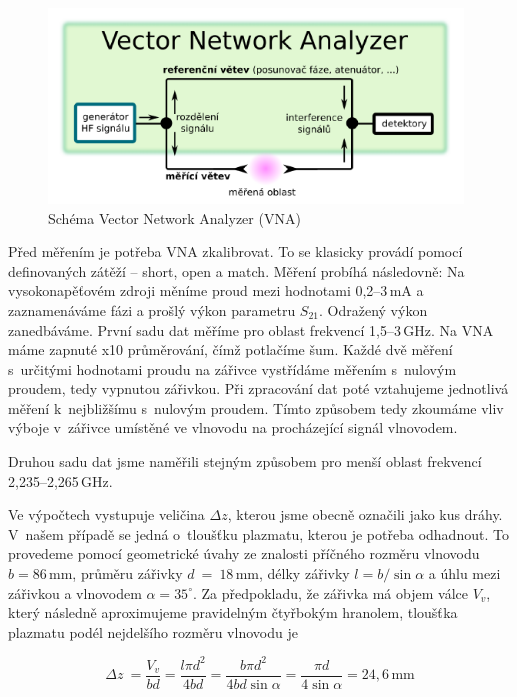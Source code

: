 \documentclass[a4paper,12pt]{article}
\begin{document}
\begin{figure}[h]
	\centering
	\includegraphics[width=110mm]{vna.png}
	\caption{Schéma Vector Network Analyzer (VNA)}
	\label{vna}
\end{figure}

Před měřením je potřeba VNA zkalibrovat. To se klasicky provádí pomocí definovaných
zátěží -- short, open a match. Měření probíhá následovně: Na vysokonapěťovém zdroji
měníme proud mezi hodnotami 0,2--3\,\si{\milli\ampere} a zaznamenáváme fázi a 
prošlý
výkon parametru $S_{21}$. Odražený výkon zanedbáváme. První sadu dat měříme pro oblast
frekvencí 1,5--3\,\si{\giga\hertz}. Na VNA máme zapnuté x10 průměrování, čímž 
potlačíme
šum. Každé dvě měření s~určitými hodnotami proudu na zářivce vystřídáme měřením
s~nulovým proudem, tedy vypnutou zářivkou. Při zpracování dat poté vztahujeme jednotlivá
měření k~nejbližšímu s~nulovým proudem. Tímto způsobem tedy zkoumáme vliv výboje v~zářivce umístěné ve vlnovodu na procházející signál vlnovodem.

Druhou sadu dat jsme naměřili stejným způsobem pro menší oblast frekvencí 
2,235--2,265\,\si{\giga\hertz}.

Ve výpočtech vystupuje veličina $\Delta z$, kterou jsme obecně označili jako kus dráhy.
V~našem případě se jedná o~tloušťku plazmatu, kterou je potřeba odhadnout. To provedeme
pomocí geometrické úvahy ze znalosti příčného rozměru vlnovodu $b = 
86$\,\si{\milli\meter},
průměru zářivky $d$~=~$18$\,\si{\milli\meter}, délky zářivky $l = b/\sin\alpha$ 
a úhlu mezi 
zářivkou a vlnovodem 
$\alpha = 35^{\circ}$. Za
předpokladu, že zářivka má objem válce $V_v$, který následně aproximujeme 
pravidelným
čtyř\-bo\-kým hranolem, tloušťka plazmatu podél nejdelšího rozměru vlnovodu je

\begin{equation}
	\Delta z~= \frac{V_v}{bd} = \frac{l \pi d^2}{4bd} = \frac{b \pi 
	d^2}{4bd\sin\alpha} = \frac{\pi d}{4\sin\alpha} = 24,6\,\si{\milli\meter}
\end{equation}
\end{document}
